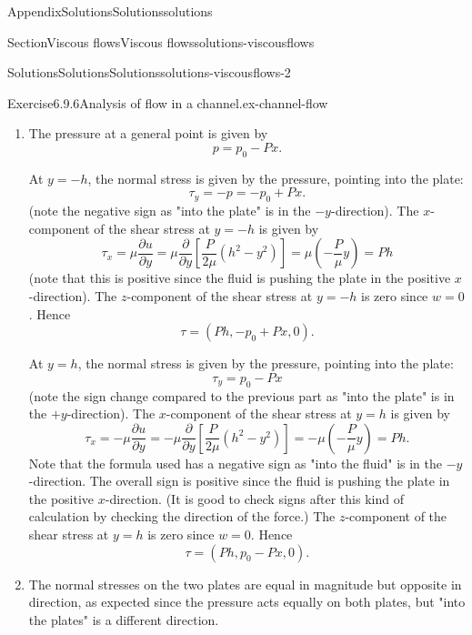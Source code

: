 \documentclass[oneside,10pt,]{book}
\numberwithin{equation}{section}
\newcommand{\pd}[2]{\frac{\partial#1}{\partial#2}}
\begin{document}
\begin{appendixptx}{Appendix}{Solutions}{}{Solutions}{}{}{solutions}
\begin{sectionptx}{Section}{Viscous flows}{}{Viscous flows}{}{}{solutions-viscousflows}
\begin{solutions-subsection-numberless}{Solutions}{Solutions}{}{Solutions}{}{}{solutions-viscousflows-2}
\begin{divisionsolution}{Exercise}{6.9.6}{Analysis of flow in a channel.}{ex-channel-flow}
\begin{enumerate}[font=\bfseries,label=(\alph*),ref=\alph*]
\item[(f)]\noindent\hypertarget{ex-channel-flow-8-2-main}{}The pressure at a general point is given by%
\begin{equation*}
p=p_0-Px.
\end{equation*}
%
\par
At \(y=-h\), the normal stress is given by the pressure, pointing into the plate:%
\begin{equation*}
\tau_y=-p=-p_0+Px.
\end{equation*}
(note the negative sign as "into the plate" is in the \(-y\)-direction). The \(x\)-component of the shear stress at \(y=-h\) is given by%
\begin{equation*}
\tau_x=\mu\pd{u}{y}=\mu\pd{}{y}\left[\frac{P}{2\mu}(h^2-y^2)\right]
=\mu\left(-\frac{P}{\mu}y\right)=Ph
\end{equation*}
(note that this is positive since the fluid is pushing the plate in the positive \(x\)-direction). The \(z\)-component of the shear stress at \(y=-h\) is zero since \(w=0\). Hence%
\begin{equation*}
\tau=(Ph,-p_0+Px,0).
\end{equation*}
%
\par
At \(y=h\), the normal stress is given by the pressure, pointing into the plate:%
\begin{equation*}
\tau_y=p_0-Px
\end{equation*}
(note the sign change compared to the previous part as "into the plate" is in the \(+y\)-direction). The \(x\)-component of the shear stress at \(y=h\) is given by%
\begin{equation*}
\tau_x=-\mu\pd{u}{y}=-\mu\pd{}{y}\left[\frac{P}{2\mu}(h^2-y^2)\right]
=-\mu\left(-\frac{P}{\mu}y\right)=Ph.
\end{equation*}
Note that the formula used has a negative sign as "into the fluid" is in the \(-y\)-direction. The overall sign is positive since the fluid is pushing the plate in the positive \(x\)-direction. (It is good to check signs after this kind of calculation by checking the direction of the force.) The \(z\)-component of the shear stress at \(y=h\) is zero since \(w=0\). Hence%
\begin{equation*}
\tau=(Ph,p_0-Px,0).
\end{equation*}
%
\item[(g)]\noindent\hypertarget{ex-channel-flow-9-2-main}{}The normal stresses on the two plates are equal in magnitude but opposite in direction, as expected since the pressure acts equally on both plates, but "into the plates" is a different direction.%

\end{enumerate}
\end{divisionsolution}
\end{solutions-subsection-numberless}
\end{sectionptx}
\end{appendixptx}
\end{document}
